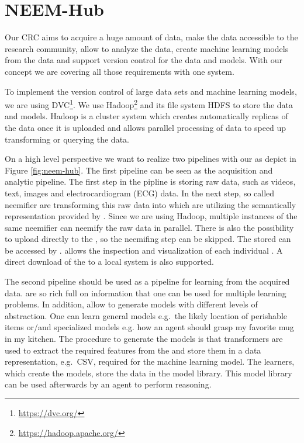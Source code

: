 \chapter{NEEM-Hub}
\label{ch:neemhub}


Our CRC aims to acquire a huge amount of data, make the data accessible to the research community,  allow to analyze the data, create machine learning models from the data and support version control for the data and models. 
With our \neemhub concept we are covering all those requirements with one system.

To implement the version control of large data sets and machine learning models, we are using DVC\footnote{\url{https://dvc.org/}}. 
We use Hadoop\footnote{\url{https://hadoop.apache.org/}} and its file system HDFS to store the data and models.
Hadoop is a cluster system which creates automatically replicas of the data once it is uploaded and allows parallel processing of data to speed up transforming or querying the data.

On a high level perspective we want to realize two pipelines with our \neemhub as depict in Figure \ref{fig:neem-hub}.
The first pipeline can be seen as the acquisition and analytic pipeline.
The first step in the pipline is storing raw data, such as videos, text, images and electrocardiogram (ECG) data.
In the next step, so called neemifier are transforming this raw data into \neems which are utilizing the semantically representation provided by \soma.
Since we are using Hadoop, multiple instances of the same neemifier can neemify the raw data in parallel. 
There is also the possibility to upload \neems directly to the \neemhub, so the neemifing step can be skipped.
The stored \neems can be accessed by \openease. 
\openease allows the inspection and visualization of each individual \neem.
A direct download of the \neems to a local system is also supported.

The second pipeline should be used as a pipeline for learning from the acquired data.
\neems are so rich full on information that one \neem can be used for multiple learning problems.
In addition, \neems allow to generate models with different levels of abstraction. 
One can learn general models e.g.\ the likely location of perishable items or/and specialized models e.g. how an agent should grasp my favorite mug in my kitchen.
The procedure to generate the models is that transformers are used to extract the required features from the \neems and store them in a data representation, e.g.\ CSV, required for the machine learning model.
The learners, which create the models, store the data in the model library. 
This model library can be used afterwards by an agent to perform reasoning.

